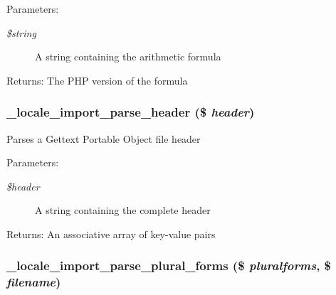 \begin{Desc}
\item[Parameters:]
\begin{description}
\item[{\em \$string}]A string containing the arithmetic formula \end{description}
\end{Desc}
\begin{Desc}
\item[Returns:]The PHP version of the formula \end{Desc}
\hypertarget{group__locale_g1381fc54e922fe478d8ee5cfbe0c3c16}{
\subsubsection[{\_\-locale\_\-import\_\-parse\_\-header}]{\setlength{\rightskip}{0pt plus 5cm}\_\-locale\_\-import\_\-parse\_\-header (\$ {\em header})}}
\label{group__locale_g1381fc54e922fe478d8ee5cfbe0c3c16}


Parses a Gettext Portable Object file header

\begin{Desc}
\item[Parameters:]
\begin{description}
\item[{\em \$header}]A string containing the complete header \end{description}
\end{Desc}
\begin{Desc}
\item[Returns:]An associative array of key-value pairs \end{Desc}
\hypertarget{group__locale_g0fedb2e69527b0887ce2e5742488d8c2}{
\subsubsection[{\_\-locale\_\-import\_\-parse\_\-plural\_\-forms}]{\setlength{\rightskip}{0pt plus 5cm}\_\-locale\_\-import\_\-parse\_\-plural\_\-forms (\$ {\em pluralforms}, \/  \$ {\em filename})}}
\label{group__locale_g0fedb2e69527b0887ce2e5742488d8c2}


